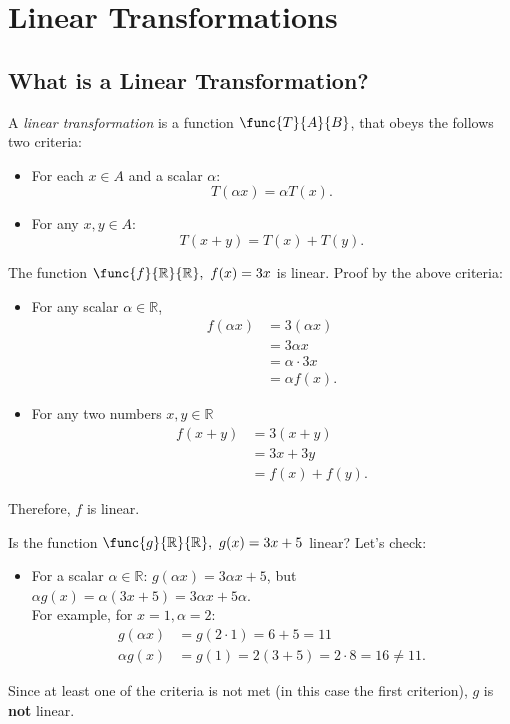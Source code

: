 \chapter{Linear Transformations}
\section{What is a Linear Transformation?}
A \emph{linear transformation} is a function $\func{T}{A}{B}$, that obeys the follows two criteria:
\begin{itemize}
  \item For each $x\in A$ and a scalar $\alpha$:
  \begin{equation*}
  T(\alpha x) = \alpha T(x).
  \end{equation*}
  \item For any $x,y\in A$:
  \begin{equation*}
  T(x+y) = T(x)+T(y).
  \end{equation*}
\end{itemize}

\begin{example}
  The function $\func{f}{\mathbb{R}}{\mathbb{R}},\ f(x)=3x$ is linear. Proof by the above criteria:
  \begin{itemize}
  \item For any scalar $\alpha\in\mathbb{R}$, 
  \begin{align*}
  f(\alpha x) &= 3(\alpha x)\\
  &= 3\alpha x\\
  &= \alpha \cdot 3x\\
  &= \alpha f(x).
  \end{align*}
  \item For any two numbers $x,y\in\mathbb{R}$
  \begin{align*}
  f(x+y) &= 3(x+y)\\
  &= 3x+3y\\
  &= f(x)+f(y).
  \end{align*}
  \end{itemize}
  Therefore, $f$ is linear.
\end{example}

\begin{example}
  Is the function $\func{g}{\mathbb{R}}{\mathbb{R}},\ g(x)=3x+5$ linear? Let's check:
  \begin{itemize}
  \item For a scalar $\alpha\in\mathbb{R}$: $g(\alpha x) = 3\alpha x + 5$, but $\alpha g(x)=\alpha(3x+5)=3\alpha x + 5\alpha$.\\
  For example, for $x=1, \alpha=2$:
  \begin{align*}
  g(\alpha x) &= g(2\cdot 1) = 6+5 = 11\\
  \alpha g(x) &= g(1) = 2(3+5) = 2\cdot8 = 16 \neq 11.
  \end{align*}
  \end{itemize}
  Since at least one of the criteria is not met (in this case the first criterion), $g$ is \textbf{not} linear.
\end{example}

